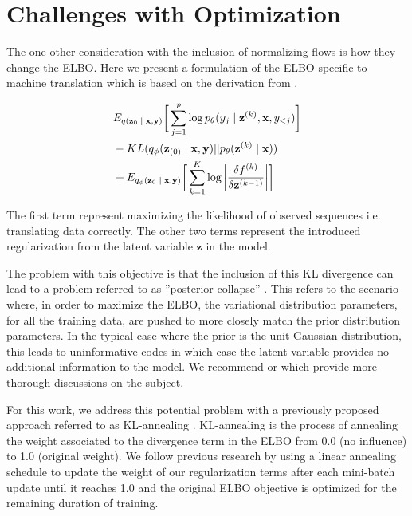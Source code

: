 \section{Challenges with Optimization}

The one other consideration with the inclusion of normalizing flows is how they change the ELBO. Here we present a formulation of the ELBO specific to machine translation which is based on the derivation from \citealp[Section 4.2]{rezende2015VIwithNF}.

\begin{align}
\begin{split}\label{eq:2}
&
E_{q(\textbf{z}_{0}\; | \;{\textbf{x}, \textbf{y}})} \bigg[ \sum_{j=1}^{p} \log p_{\theta}(y_{j} \; | \;{\textbf{z}^{(k)}}, \textbf{x}, y_{<j}) \bigg] \\
& - KL(q_{\phi}(\textbf{z}_{(0)} \; | \;{\textbf{x}, \textbf{y}}) || p_{\theta}(\textbf{z}^{(k)} \; | \;{\textbf{x}})) \\
&   +  E_{q_{\phi}(\textbf{z}_{0} \; | \;{\textbf{x}, \textbf{y}})} \bigg[\sum_{k=1}^{K} \log \bigg|\frac{\delta f^{(k)}}{\delta \textbf{z}^{(k-1)}} \bigg| \bigg]  
\end{split}
\end{align}

The first term represent maximizing the likelihood of observed sequences i.e. translating data correctly. The other two terms represent the introduced regularization from the latent variable $\textbf{z}$ in the model. 

The problem with this objective is that the inclusion of this KL divergence can lead to a problem referred to as ''posterior collapse'' \cite{he2018lagging}. This refers to the scenario where, in order to maximize the ELBO, the variational distribution parameters, for all the training data, are pushed to more closely match the prior distribution parameters. In the typical case where the prior is the unit Gaussian distribution, this leads to uninformative codes in which case the latent variable provides no additional information to the model. We recommend \citet{chen2016VariationalLossyAE} or \citet{zhao2017InfoVAE} which provide more thorough discussions on the subject. 

 

For this work, we address this potential problem with a previously proposed approach referred to as KL-annealing \cite{bowman2015GeneratingSent,sonderby2016LadderVAE}. KL-annealing is the process of annealing the weight associated to the divergence term in the ELBO from 0.0 (no influence) to 1.0 (original weight). We follow previous research by using a linear annealing schedule to update the weight of our regularization terms after each mini-batch update until it reaches 1.0 and the original ELBO objective is optimized for the remaining duration of training. 


